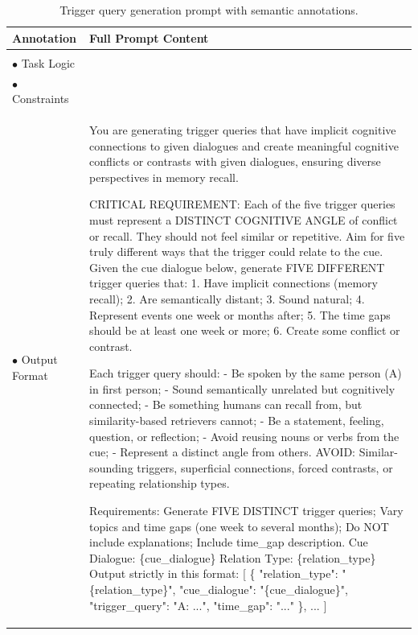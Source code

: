\documentclass[11pt]{article}
\begin{document}
\begin{table}[t]
\centering
\small
\renewcommand{\arraystretch}{1.5}
\begin{tabularx}{\textwidth}{l | X}
\toprule
\textbf{Annotation} & \textbf{Full Prompt Content} \\ \midrule

\begin{tabular}[t]{@{}l@{}}
    \textcolor{cRole}{$\bullet$ Role Setting} \\
    \textcolor{cLogic}{$\bullet$ Task Logic} \\
    \textcolor{cReq}{$\bullet$ Constraints} \\
    \textcolor{cFormat}{$\bullet$ Output Format}
\end{tabular} & 
\textcolor{cRole}{You are generating trigger queries that have implicit cognitive connections to given dialogues and create meaningful cognitive conflicts or contrasts with given dialogues, ensuring diverse perspectives in memory recall.} 

\vspace{0.5em}
\textcolor{cLogic}{CRITICAL REQUIREMENT: Each of the five trigger queries must represent a DISTINCT COGNITIVE ANGLE of conflict or recall. They should not feel similar or repetitive. Aim for five truly different ways that the trigger could relate to the cue. Given the cue dialogue below, generate FIVE DIFFERENT trigger queries that: 1. Have implicit connections (memory recall); 2. Are semantically distant; 3. Sound natural; 4. Represent events one week or months after; 5. The time gaps should be at least one week or more; 6. Create some conflict or contrast.} 

\vspace{0.5em}
\textcolor{cReq}{Each trigger query should: - Be spoken by the same person (A) in first person; - Sound semantically unrelated but cognitively connected; - Be something humans can recall from, but similarity-based retrievers cannot; - Be a statement, feeling, question, or reflection; - Avoid reusing nouns or verbs from the cue; - Represent a distinct angle from others. AVOID: Similar-sounding triggers, superficial connections, forced contrasts, or repeating relationship types.}

\vspace{0.5em}
\textcolor{cFormat}{Requirements: Generate FIVE DISTINCT trigger queries; Vary topics and time gaps (one week to several months); Do NOT include explanations; Include time\_gap description. Cue Dialogue: \{cue\_dialogue\} Relation Type: \{relation\_type\} Output strictly in this format: [ \{ "relation\_type": "\{relation\_type\}", "cue\_dialogue": "\{cue\_dialogue\}", "trigger\_query": "A: ...", "time\_gap": "..." \}, ... ]} \\ 

\bottomrule
\end{tabularx}
\caption{Trigger query generation prompt with semantic annotations.}
\label{tab:trigger-prompt}
\end{table}
\end{document}
